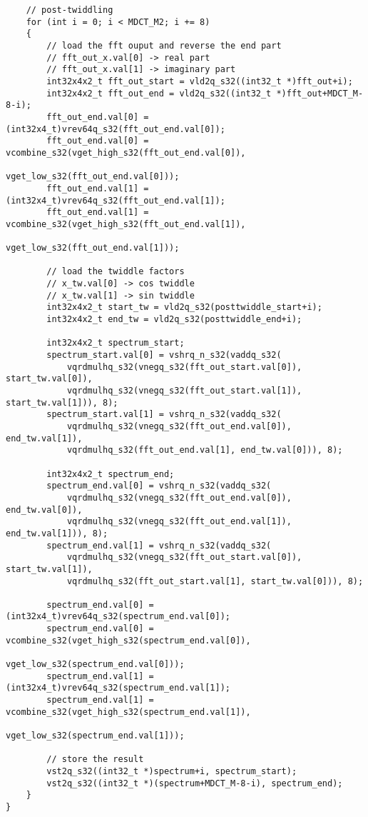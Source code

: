 \documentclass{article}
\begin{document}
\begin{lstlisting}
    // post-twiddling
    for (int i = 0; i < MDCT_M2; i += 8)
    {
        // load the fft ouput and reverse the end part
        // fft_out_x.val[0] -> real part
        // fft_out_x.val[1] -> imaginary part
        int32x4x2_t fft_out_start = vld2q_s32((int32_t *)fft_out+i);
        int32x4x2_t fft_out_end = vld2q_s32((int32_t *)fft_out+MDCT_M-8-i);
        fft_out_end.val[0] = (int32x4_t)vrev64q_s32(fft_out_end.val[0]);
        fft_out_end.val[0] = vcombine_s32(vget_high_s32(fft_out_end.val[0]),
                                          vget_low_s32(fft_out_end.val[0]));
        fft_out_end.val[1] = (int32x4_t)vrev64q_s32(fft_out_end.val[1]);
        fft_out_end.val[1] = vcombine_s32(vget_high_s32(fft_out_end.val[1]),
                                          vget_low_s32(fft_out_end.val[1]));

        // load the twiddle factors
        // x_tw.val[0] -> cos twiddle
        // x_tw.val[1] -> sin twiddle
        int32x4x2_t start_tw = vld2q_s32(posttwiddle_start+i);
        int32x4x2_t end_tw = vld2q_s32(posttwiddle_end+i);

        int32x4x2_t spectrum_start;
        spectrum_start.val[0] = vshrq_n_s32(vaddq_s32(
            vqrdmulhq_s32(vnegq_s32(fft_out_start.val[0]), start_tw.val[0]),
            vqrdmulhq_s32(vnegq_s32(fft_out_start.val[1]), start_tw.val[1])), 8);
        spectrum_start.val[1] = vshrq_n_s32(vaddq_s32(
            vqrdmulhq_s32(vnegq_s32(fft_out_end.val[0]), end_tw.val[1]),
            vqrdmulhq_s32(fft_out_end.val[1], end_tw.val[0])), 8);

        int32x4x2_t spectrum_end;
        spectrum_end.val[0] = vshrq_n_s32(vaddq_s32(
            vqrdmulhq_s32(vnegq_s32(fft_out_end.val[0]), end_tw.val[0]),
            vqrdmulhq_s32(vnegq_s32(fft_out_end.val[1]), end_tw.val[1])), 8);
        spectrum_end.val[1] = vshrq_n_s32(vaddq_s32(
            vqrdmulhq_s32(vnegq_s32(fft_out_start.val[0]), start_tw.val[1]),
            vqrdmulhq_s32(fft_out_start.val[1], start_tw.val[0])), 8);

        spectrum_end.val[0] = (int32x4_t)vrev64q_s32(spectrum_end.val[0]);
        spectrum_end.val[0] = vcombine_s32(vget_high_s32(spectrum_end.val[0]),
                                           vget_low_s32(spectrum_end.val[0]));
        spectrum_end.val[1] = (int32x4_t)vrev64q_s32(spectrum_end.val[1]);
        spectrum_end.val[1] = vcombine_s32(vget_high_s32(spectrum_end.val[1]),
                                           vget_low_s32(spectrum_end.val[1]));

        // store the result
        vst2q_s32((int32_t *)spectrum+i, spectrum_start);
        vst2q_s32((int32_t *)(spectrum+MDCT_M-8-i), spectrum_end);
    }
}
\end{lstlisting}
\end{document}
